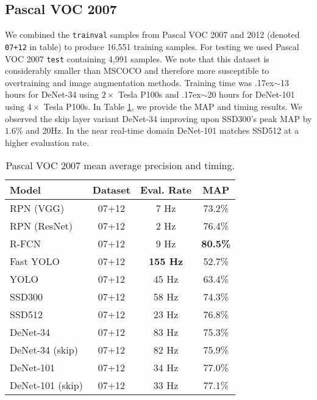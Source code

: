 \documentclass[10pt,twocolumn]{article}
\newcommand\approxtilde{\raise.17ex\hbox{$\scriptstyle\sim$}}
\begin{document}
\subsection{Pascal VOC 2007}
We combined the \texttt{trainval} samples from Pascal VOC 2007 and 2012 \cite{pascal-voc} (denoted \texttt{07+12} in table) to produce 16,551 training samples. For testing we used Pascal VOC 2007 \texttt{test} containing 4,991 samples. We note that this dataset is considerably smaller than MSCOCO and therefore more susceptible to overtraining and image augmentation methods. Training time was \approxtilde 13 hours for DeNet-34 using $2\times$ Tesla P100s and \approxtilde 20 hours for DeNet-101 using $4\times$ Tesla P100s. In Table \ref{table:voc2007}, we provide the MAP and timing results. We observed the skip layer variant DeNet-34 improving upon SSD300's peak MAP by $1.6\%$ and 20Hz. In the near real-time domain DeNet-101 matches SSD512 at a higher evaluation rate. 







\begin{table}[tb]
\begin{center}
\begin{tabular}{ l|c|c|c}
 Model & Dataset & Eval. Rate & MAP \\
\hline
\rowcolor[gray]{.85} RPN (VGG) & 07+12 & 7 Hz & 73.2\% \\
\rowcolor[gray]{.85} RPN (ResNet) & 07+12 & 2 Hz & 76.4\% \\
\rowcolor[gray]{.85} R-FCN & 07+12 & 9 Hz & \textbf{80.5\%}  \\
Fast YOLO & 07+12& \textbf{155 Hz} & 52.7\%  \\
YOLO & 07+12& 45 Hz & 63.4\%  \\
SSD300 & 07+12& 58 Hz & 74.3\% \\
SSD512 & 07+12& 23 Hz & 76.8\%  \\
\hline
DeNet-34 & 07+12 & 83 Hz &  75.3\% \\
DeNet-34 (skip) & 07+12 & 82 Hz &  75.9\% \\
DeNet-101 & 07+12 & 34 Hz & 77.0\% \\
DeNet-101 (skip) & 07+12 & 33 Hz & 77.1\% \\
\end{tabular}
\end{center}
\caption{Pascal VOC 2007 mean average precision and timing. }
\label{table:voc2007}
\end{table}
\end{document}
